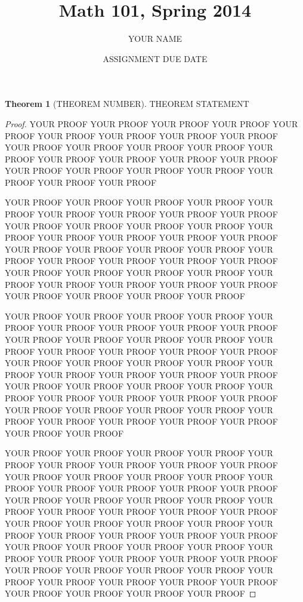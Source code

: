 \documentclass[11pt]{article}
\title{Math 101, Spring 2014}
\author{YOUR NAME} %
\date{ASSIGNMENT DUE DATE} %
\theoremstyle{definition}
\newtheorem*{theorem}{Theorem}
\begin{document}
\maketitle



\begin{theorem}[THEOREM NUMBER]
THEOREM STATEMENT
\end{theorem}

\begin{proof}
YOUR PROOF YOUR PROOF YOUR PROOF YOUR PROOF YOUR PROOF YOUR PROOF YOUR
PROOF YOUR PROOF YOUR PROOF YOUR PROOF YOUR PROOF YOUR PROOF YOUR
PROOF YOUR PROOF YOUR PROOF YOUR PROOF YOUR PROOF YOUR PROOF YOUR
PROOF YOUR PROOF YOUR PROOF YOUR PROOF YOUR PROOF
YOUR PROOF YOUR PROOF

YOUR PROOF YOUR PROOF YOUR PROOF YOUR PROOF YOUR PROOF YOUR PROOF YOUR
PROOF YOUR PROOF YOUR PROOF YOUR PROOF YOUR PROOF YOUR PROOF YOUR
PROOF YOUR PROOF YOUR PROOF YOUR PROOF YOUR PROOF YOUR PROOF YOUR
PROOF YOUR PROOF YOUR PROOF YOUR PROOF YOUR PROOF YOUR PROOF YOUR
PROOF YOUR PROOF YOUR PROOF YOUR PROOF YOUR PROOF YOUR PROOF YOUR
PROOF YOUR PROOF YOUR PROOF YOUR PROOF YOUR PROOF YOUR PROOF YOUR
PROOF YOUR PROOF YOUR PROOF YOUR PROOF


YOUR PROOF YOUR PROOF YOUR PROOF YOUR PROOF YOUR PROOF YOUR PROOF YOUR
PROOF YOUR PROOF YOUR PROOF YOUR PROOF YOUR PROOF YOUR PROOF YOUR
PROOF YOUR PROOF YOUR PROOF YOUR PROOF YOUR PROOF YOUR PROOF YOUR
PROOF YOUR PROOF YOUR PROOF YOUR PROOF YOUR PROOF YOUR PROOF YOUR
PROOF YOUR PROOF YOUR PROOF YOUR PROOF YOUR PROOF YOUR PROOF YOUR
PROOF YOUR PROOF YOUR PROOF YOUR PROOF YOUR PROOF YOUR PROOF YOUR
PROOF YOUR PROOF YOUR PROOF YOUR PROOF YOUR PROOF YOUR PROOF YOUR
PROOF YOUR PROOF YOUR PROOF YOUR PROOF YOUR PROOF

YOUR PROOF YOUR PROOF YOUR PROOF YOUR PROOF YOUR PROOF YOUR PROOF YOUR
PROOF YOUR PROOF YOUR PROOF YOUR PROOF YOUR PROOF YOUR PROOF YOUR
PROOF YOUR PROOF YOUR PROOF YOUR PROOF YOUR PROOF YOUR PROOF YOUR
PROOF YOUR PROOF YOUR PROOF YOUR PROOF YOUR PROOF YOUR PROOF YOUR
PROOF YOUR PROOF YOUR PROOF YOUR PROOF YOUR PROOF YOUR PROOF YOUR
PROOF YOUR PROOF YOUR PROOF YOUR PROOF YOUR PROOF YOUR PROOF YOUR
PROOF YOUR PROOF YOUR PROOF YOUR PROOF YOUR PROOF YOUR PROOF YOUR
PROOF YOUR PROOF YOUR PROOF YOUR PROOF YOUR PROOF YOUR PROOF YOUR
PROOF YOUR PROOF YOUR PROOF YOUR PROOF YOUR PROOF YOUR PROOF YOUR
PROOF YOUR PROOF YOUR PROOF YOUR PROOF

\end{proof}
\end{document}
